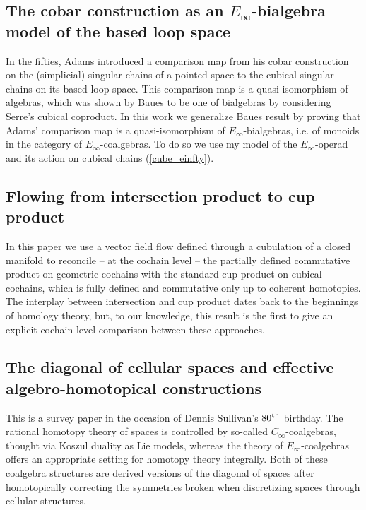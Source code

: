 \documentclass{amsart}
\begin{document}
\subsection{The cobar construction as an $E_\infty$-bialgebra model of the based loop space {\rm \cite{medina2021cobar}}} \label{cobar}

In the fifties, Adams introduced a comparison map from his cobar construction on the (simplicial) singular chains of a pointed space to the cubical singular chains on its based loop space.
This comparison map is a quasi-isomorphism of algebras, which was shown by Baues to be one of bialgebras by considering Serre's cubical coproduct.
In this work we generalize Baues result by proving that Adams' comparison map is a quasi-isomorphism of $E_\infty$-bialgebras, i.e. of monoids in the category of $E_\infty$-coalgebras.
To do so we use my model of the $E_\infty$-operad and its action on cubical chains (\cref{cube_einfty}).

\subsection{Flowing from intersection product to cup product {\rm \cite{medina2021flowing}}} \label{flowing}

In this paper we use a vector field flow defined through a cubulation of a closed manifold to reconcile -- at the cochain level -- the partially defined commutative product on geometric cochains with the standard cup product on cubical cochains, which is fully defined and commutative only up to coherent homotopies. The interplay between intersection and cup product dates back to the beginnings of homology theory, but, to our knowledge, this result is the first to give an explicit cochain level comparison between these approaches.

\subsection{The diagonal of cellular spaces and effective algebro-homotopical constructions {\rm \cite{medina2022dennis}}} \label{dennis}

This is a survey paper in the occasion of Dennis Sullivan's $80^{\mathrm{th}}$ birthday.
The rational homotopy theory of spaces is controlled by so-called $C_\infty$-coalgebras, thought via Koszul duality as Lie models, whereas the theory of $E_\infty$-coalgebras offers an appropriate setting for homotopy theory integrally.
Both of these coalgebra structures are derived versions of the diagonal of spaces after homotopically correcting the symmetries broken when discretizing spaces through cellular structures.
\end{document}
